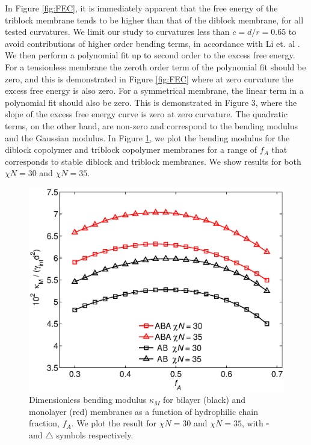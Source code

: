 \documentclass[twocolumn,aps,floatfix,nobibnotes]{revtex4-1}
\begin{document}
In Figure \ref{fig:FEC}, it is immediately apparent that the free energy of the triblock membrane tends to be higher than that of the diblock membrane, for all tested curvatures. We limit our study to curvatures less than $c = d/r = 0.65$ to avoid contributions of higher order bending terms, in accordance with Li et. al \cite{li2013elastic}. We then perform a polynomial fit up to second order to the excess free energy. For a tensionless membrane the zeroth order term of the polynomial fit should be zero, and this is demonstrated in Figure \ref{fig:FEC} where at zero curvature the excess free energy is also zero. For a symmetrical membrane, the linear term in a polynomial fit should also be zero. This is demonstrated in Figure 3, where the slope of the excess free energy curve is zero at zero curvature. The quadratic terms, on the other hand, are non-zero and correspond to the bending modulus and the Gaussian modulus. In Figure \ref{fig:Bending_mod}, we plot the bending modulus for the diblock copolymer and triblock copolymer membranes for a range of $f_A$ that corresponds to stable diblock and triblock membranes. We show results for both $\chi N  = 30$ and $\chi N = 35$. 

\begin{figure}[htp]
\centering
\includegraphics[width=1.0\columnwidth]{bending_mod.eps}
\caption{Dimensionless bending modulus $\kappa_M$ for bilayer (black) and monolayer (red) membranes as a function of hydrophilic chain fraction, $f_A$. We plot the result for $\chi N = 30$ and $\chi N =35$, with $\square$ and $\triangle$ symbols respectively.}
\label{fig:Bending_mod}
\centering
\end{figure}
\end{document}
